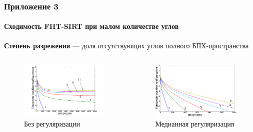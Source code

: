 \documentclass[12pt]{beamer}
\begin{document}
\begin{frame}
\frametitle{Приложение 3}
\framesubtitle{Сходимость FHT-SIRT при малом количестве углов}
\textbf{Степень разрежения} --- доля отсутствующих углов полного БПХ-пространства
\begin{columns}[T,onlytextwidth]
  \hspace*{-1cm}
  \begin{column}{0.6\textwidth}
  \begin{figure}
    \includegraphics[width=\textwidth]{../Dissertation/images/part1_img/raw}
    \caption{Без регуляризации}
  \end{figure}
  
  \end{column}
  \begin{column}{0.55\textwidth}
    \begin{figure}
    \includegraphics[width=\textwidth]{../Dissertation/images/part1_img/medk}
    \caption{Медианная регуляризация}
    \end{figure}
  \end{column}
\end{columns}
\end{frame}
\end{document}
